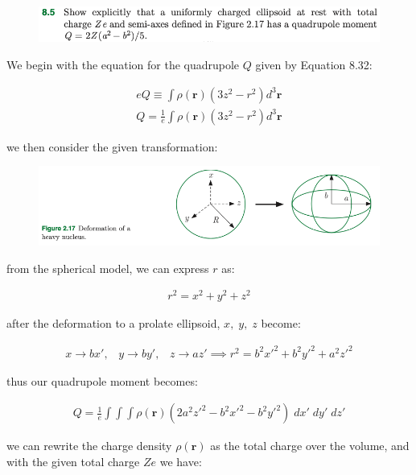\documentclass[11pt]{article}
\theoremstyle{definition}
\begin{document}
\newpage
\setcounter{equation}{0}
\begin{figure}[h!]
    \centering
    \includegraphics[scale = 0.55]{8.5.png}
\end{figure}

We begin with the equation for the quadrupole $Q$ given by Equation 8.32:

\begin{align*}
    eQ \equiv \int \rho(\mathbf{r}) (3z^2-r^2) d^3\mathbf{r} \tag*{(8.32)}\\
    Q = \frac{1}{e}\int \rho(\mathbf{r}) (3z^2-r^2) d^3\mathbf{r} \tag*{(8.32.1)}
\end{align*}

we then consider the given transformation:

\begin{figure}[h!]
    \centering
    \includegraphics[scale = 0.55]{fig2.17.png}
\end{figure}

from the spherical model, we can express $r$ as:

\begin{align*}
    r^2 = x^2 + y^2 + z^2
\end{align*}

after the deformation to a prolate ellipsoid, $x,\; y,\; z$ become:

\begin{align*}
    x \to bx', \;\;\; y \to by', \;\;\; z \to az' \implies
    r^2 = b^2x'^2 + b^2y'^2 + a^2z'^2
\end{align*}

thus our quadrupole moment becomes:

\begin{align*}
    Q = \frac{1}{e}\int \int \int \rho(\mathbf{r}) (2a^2z'^2 - b^2x'^2 - b^2y'^2) \; dx'\; dy'\; dz' \tag*{(8.32.2)}
\end{align*}

we can rewrite the charge density $\rho(\mathbf{r})$ as the total charge over the volume, and with the given total charge $Ze$ we have:
\end{document}
